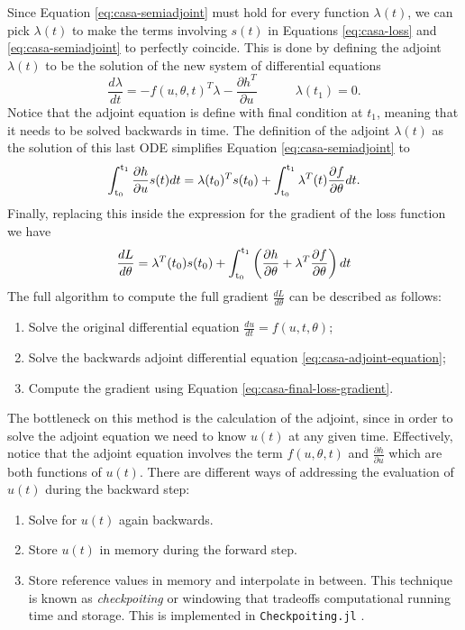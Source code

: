Since Equation \eqref{eq:casa-semiadjoint} must hold for every function $\lambda(t)$, we can pick $\lambda(t)$ to make the terms involving $s(t)$ in Equations \eqref{eq:casa-loss} and \eqref{eq:casa-semiadjoint} to perfectly coincide. 
This is done by defining the adjoint $\lambda(t)$ to be the solution of the new system of differential equations
\begin{equation}
    \frac{d\lambda}{dt} 
    = 
    - 
    f(u, \theta, t)^T \lambda  
    - 
    \frac{\partial h^T}{\partial u} 
    \qquad \quad \lambda(t_1) = 0. 
    \label{eq:casa-adjoint-equation}
\end{equation}
Notice that the adjoint equation is define with final condition at $t_1$, meaning that it needs to be solved backwards in time. 
The definition of the adjoint $\lambda(t)$ as the solution of this last ODE simplifies Equation \eqref{eq:casa-semiadjoint} to
\begin{equation}
    \operatorname{\int_{t_0}^{t_1}} \frac{\partial h}{\partial u} s(t) dt
    = 
    \lambda(t_0)^T s(t_0)
    + 
    \operatorname{\int_{t_0}^{t_1}} \lambda^T (t) \frac{\partial f}{\partial \theta} dt.
\end{equation}
Finally, replacing this inside the expression for the gradient of the loss function we have 
\begin{equation}
    \frac{dL}{d\theta}
    = 
    \lambda^T(t_0) s(t_0)
    + 
    \operatorname{\int_{t_0}^{t_1}}
    \left( \frac{\partial h}{\partial \theta} + \lambda^T \frac{\partial f}{\partial \theta} \right) dt
    \label{eq:casa-final-loss-gradient}
\end{equation}
The full algorithm to compute the full gradient $\frac{dL}{d\theta}$ can be described as follows:
\begin{enumerate}
    \item Solve the original differential equation $\frac{du}{dt} = f(u, t, \theta)$;
    \item Solve the backwards adjoint differential equation \eqref{eq:casa-adjoint-equation};
    \item Compute the gradient using Equation \eqref{eq:casa-final-loss-gradient}.
\end{enumerate}
The bottleneck on this method is the calculation of the adjoint, since in order to solve the adjoint equation we need to know $u(t)$ at any given time. 
Effectively, notice that the adjoint equation involves the term $f(u, \theta, t)$ and $\frac{\partial h}{\partial u}$ which are both functions of $u(t)$. 
There are different ways of addressing the evaluation of $u(t)$ during the backward step:
\begin{enumerate}[label=(\roman*)]
    \item Solve for $u(t)$ again backwards.
    \item Store $u(t)$ in memory during the forward step.
    \item Store reference values in memory and interpolate in between. 
    This technique is known as \textit{checkpoiting} or windowing that tradeoffs computational running time and storage.
    This is implemented in \texttt{Checkpoiting.jl} \cite{Checkpoiting_2023}.
\end{enumerate} 

